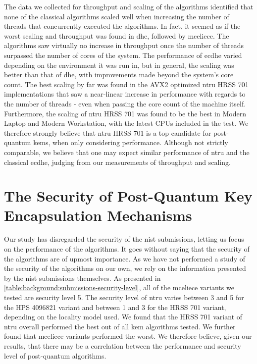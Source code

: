 The data we collected for throughput and scaling of the algorithms identified that none of the classical algorithms scaled well when increasing the number of threads that concurrently executed the algorithms. In fact, it seemed as if the worst scaling and throughput was found in \gls{dhe}, followed by \gls{mceliece}. The algorithms saw virtually no increase in throughput once the number of threads surpassed the number of cores of the system. The performance of \gls{ecdhe} varied depending on the environment it was run in, but in general, the scaling was better than that of \gls{dhe}, with improvements made beyond the system's core count. The best scaling by far was found in the AVX2 optimized \gls{ntru} HRSS 701 implementations that saw a near-linear increase in performance with regards to the number of threads - even when passing the core count of the machine itself. Furthermore, the scaling of \gls{ntru} HRSS 701 was found to be the best in Modern Laptop and Modern Workstation, with the latest CPUs included in the test. We therefore strongly believe that \gls{ntru} HRSS 701 is a top candidate for \gls{post-quantum} \glspl{kem}, when only considering performance. Although not strictly comparable, we believe that one may expect similar performance of \gls{ntru} and the classical \gls{ecdhe}, judging from our measurements of throughput and scaling.


\section{The Security of Post-Quantum Key Encapsulation Mechanisms}

Our study has disregarded the security of the \gls{nist} submissions, letting us focus on the performance of the algorithms. It goes without saying that the security of the algorithms are of upmost importance. As we have not performed a study of the security of the algorithms on our own, we rely on the information presented by the \gls{nist} submissions themselves. As presented in \ref{table:background:submissions-security-level}, all of the \gls{mceliece} variants we tested are security level 5. The security level of \gls{ntru} varies between 3 and 5 for the HPS 4096821 variant and between 1 and 3 for the HRSS 701 variant, depending on the locality model used. We found that the HRSS 701 variant of \gls{ntru} overall performed the best out of all \gls{kem} algorithms tested. We further found that \gls{mceliece} variants performed the worst. We therefore believe, given our results, that there may be a correlation between the performance and security level of \gls{post-quantum} algorithms.


